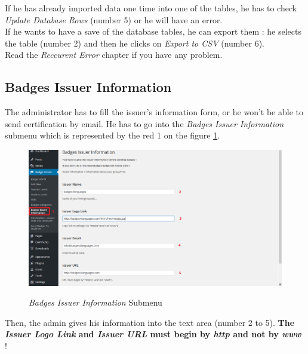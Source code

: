 \documentclass[a4paper, 12pt]{report}
\begin{document}
	If he has already imported data one time into one of the tables, he has to check \textit{Update Database Rows} (number 5) or he will have an error.\\
	
	If he wants to have a save of the database tables, he can export them : he selects the table (number 2) and then he clicks on \textit{Export to CSV} (number 6). \\
	
	Read the \textit{Reccurent Error} chapter if you have any problem.
	
	
	
	
	
	
	\newpage
	
			\subsection{Badges Issuer Information}
		
		The administrator has to fill the issuer's information form, or he won't be able to send certification by email. He has to go into the \textit{Badges Issuer Information} submenu which is represented by the red 1 on the figure \ref{badgesIssuerInformation}.
			
	\begin{figure}[h]
		\caption{\textit{Badges Issuer Information} Submenu}
		\includegraphics[scale=0.45]{includes/badgesIssuerInformation}
		\label{badgesIssuerInformation}
	\end{figure}
	
	Then, the admin gives his information into the text area (number 2 to 5). \textbf{The \textit{Issuer Logo Link} and \textit{Issuer URL} must begin by \textit{http} and not by \textit{www}} !
	
	
	
	
	\newpage
	
\end{document}
